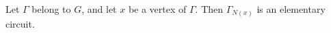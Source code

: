 Let $\Gamma$ belong to $G$, and let $x$ be a vertex of $\Gamma$. Then $\Gamma_{N(x)}$ is an elementary circuit.
